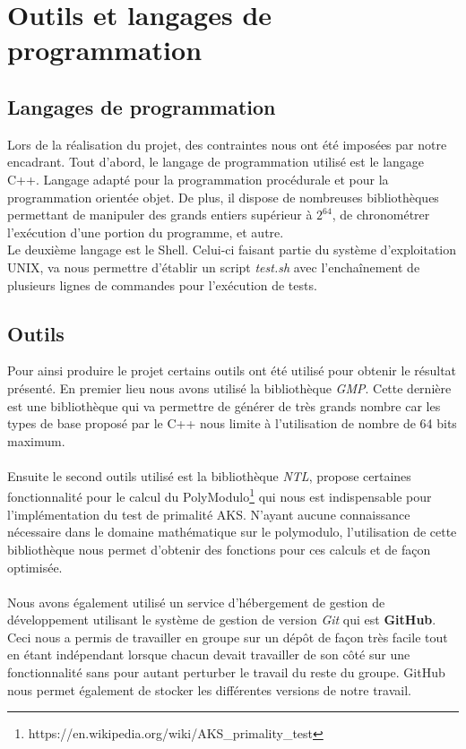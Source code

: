 	\section{Outils et langages de programmation}
		\subsection{Langages de programmation}
		Lors de la réalisation du projet, des contraintes nous ont été imposées par notre encadrant. Tout d'abord, le langage de programmation utilisé est le langage C++. Langage adapté pour la programmation procédurale et pour la programmation orientée objet. De plus, il dispose de nombreuses bibliothèques permettant de manipuler des grands entiers supérieur à $2^{64}$, de chronométrer l'exécution d'une portion du programme, et autre.\\
		Le deuxième langage est le Shell. Celui-ci faisant partie du système d'exploitation UNIX, va nous permettre d'établir un script \textit{test.sh} avec l’enchaînement de plusieurs lignes de commandes pour l'exécution de tests.
		
		\subsection{Outils}
		Pour ainsi produire le projet certains outils ont été utilisé pour obtenir le résultat présenté. En premier lieu nous avons utilisé la bibliothèque \textit{GMP}.  Cette dernière est une bibliothèque qui va permettre de générer de très grands nombre car les types de base proposé par le C++ nous limite à l'utilisation de nombre de 64 bits maximum.
		\paragraph{}Ensuite le second outils utilisé est la bibliothèque \textit{NTL}, propose certaines fonctionnalité pour le calcul du PolyModulo\footnote{https://en.wikipedia.org/wiki/AKS\_primality\_test} qui nous est indispensable pour l'implémentation du test de primalité AKS. N'ayant aucune connaissance nécessaire dans le domaine mathématique sur le polymodulo, l'utilisation de cette bibliothèque nous permet d'obtenir des fonctions pour ces calculs et de façon optimisée.  
		\paragraph{}Nous avons également utilisé un service d’hébergement de gestion de développement utilisant le système de gestion de version \textit{Git} qui est \textbf{GitHub}. Ceci nous a permis de travailler en groupe sur un dépôt de façon très facile tout en étant indépendant lorsque chacun devait travailler de son côté sur une fonctionnalité sans pour autant perturber le travail du reste du groupe. GitHub nous permet également de stocker les différentes versions de notre travail.   

